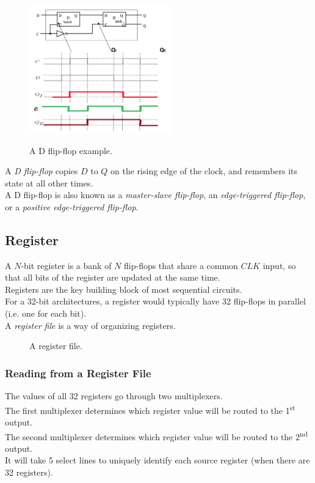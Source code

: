 \documentclass[12pt]{article}
\theoremstyle{definition}
\newcommand{\includePicture}[3]{
  \begin{figure}[!ht]
  \centering
  \scalebox{#1}{\texttt{[image: \#2]}}
  \caption{#3}
  \end{figure}
}
\begin{document}
  \begin{figure}[!ht]
  \centering
  \includegraphics[width=0.55\textwidth]{pictures/dFlipFlopExample.png} \\
  \caption{A D flip-flop example.}
  \end{figure}
  A \emph{D flip-flop} copies $D$ to $Q$ on the rising edge of the clock, and remembers its state at all other times. \\

  A D flip-flop is also known as a \emph{master-slave flip-flop}, an \emph{edge-triggered flip-flop}, or a \emph{positive edge-triggered flip-flop}.

  \subsection{Register}
  A $N$-bit register is a bank of $N$ flip-flops that share a common $CLK$ input, so that all bits of the register are updated at the same time. \\
  Registers are the key building block of most sequential circuits. \\

  For a 32-bit architectures, a register would typically have 32 flip-flops in parallel (i.e. one for each bit). \\
  A \emph{register file} is a way of organizing registers. \\
  \includePicture{1.0}{pictures/registerFile.png}{A register file.} \label{registerFile}

  \subsubsection{Reading from a Register File}
  The values of all 32 registers go through two multiplexers. \\
  The first multiplexer determines which register value will be routed to the 1\textsuperscript{st} output. \\
  The second multiplexer determines which register value will be routed to the 2\textsuperscript{nd} output. \\
  It will take 5 select lines to uniquely identify each source register (when there are 32 registers).
\end{document}
